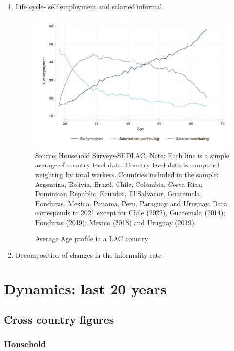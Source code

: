 \documentclass[english]{article}
\begin{document}
\begin{enumerate}
\item Life cycle- self employment and salaried informal
 \begin{figure}[h!tbp]
        \justifying
        \caption{Average Age profile in a LAC country}     
        \includegraphics[scale=.3]{latex/figures/Snapshot/age_profile.png}
        \label{fig:age_pro}
        \footnotesize{Source: Household Surveys-SEDLAC.}
        \footnotesize{Note: Each line is a simple average of country level data. Country level data is computed weighting by total workers. Countries included in the sample: Argentina, Bolivia, Brazil, Chile, Colombia, Costa Rica, Dominican Republic, Ecuador, El Salvador, Guatemala, Honduras, Mexico, Panama, Peru, Paraguay and Uruguay. Data corresponds to 2021 except for  Chile (2022), Guatemala (2014); Honduras (2019); Mexico (2018) and Uruguay (2019).}
        \end{figure}
\item Decomposition of changes in the informality rate

\end{enumerate}
   
     
\section{Dynamics: last 20 years}  

\subsection{Cross country figures}
\subsubsection{Household}
\end{document}
